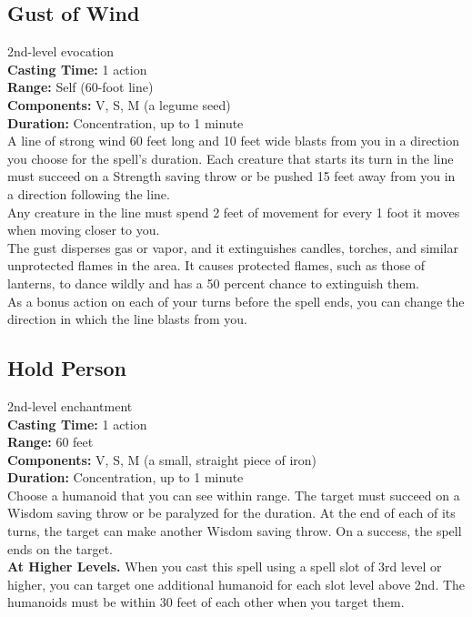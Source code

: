 \documentclass[11pt, A4paper, english]{article}
\begin{document}
		\subsection{Gust of Wind}
2nd-level evocation \\
\textbf{Casting Time:} 1 action \\
\textbf{Range:} Self (60-foot line) \\
\textbf{Components:} V, S, M (a legume seed) \\
\textbf{Duration:} Concentration, up to 1 minute \\
A line of strong wind 60 feet long and 10 feet wide blasts from you in a direction you choose for the spell’s duration. Each creature that starts its turn in the line must succeed on a Strength saving throw or be pushed 15 feet away from you in a direction following the line. \\
Any creature in the line must spend 2 feet of movement for every 1 foot it moves when moving closer to you. \\
The gust disperses gas or vapor, and it extinguishes candles, torches, and similar unprotected flames in the area. It causes protected flames, such as those of lanterns, to dance wildly and has a 50 percent chance to extinguish them. \\
As a bonus action on each of your turns before the spell ends, you can change the direction in which the line blasts from you.

		\subsection{Hold Person}
2nd-level enchantment \\
\textbf{Casting Time:} 1 action \\
\textbf{Range:} 60 feet \\
\textbf{Components:} V, S, M (a small, straight piece of iron) \\
\textbf{Duration:} Concentration, up to 1 minute \\
Choose a humanoid that you can see within range. The target must succeed on a Wisdom saving throw or be paralyzed for the duration. At the end of each of its turns, the target can make another Wisdom saving throw. On a success, the spell ends on the target. \\
\textbf{At Higher Levels.} When you cast this spell using a spell slot of 3rd level or higher, you can target one additional humanoid for each slot level above 2nd. The humanoids must be within 30 feet of each other when you target them.
\end{document}
